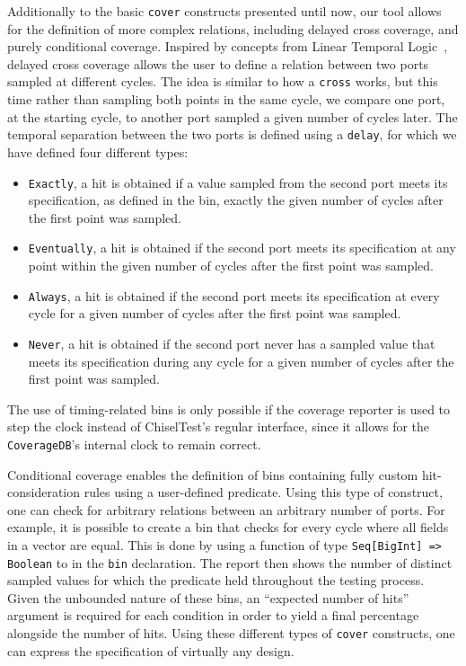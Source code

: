 \documentclass[conference]{IEEEtran}
\begin{document}
Additionally to the basic \texttt{cover} constructs presented until now, our tool allows for the definition of more complex relations, including delayed cross coverage, and purely conditional coverage.
Inspired by concepts from Linear Temporal Logic~\cite{Dax2010:temporal-logics}, delayed cross coverage allows the user to define a relation between two ports sampled at different cycles.
The idea is similar to how a \texttt{cross} works, but this time rather than sampling both points in the same cycle, we compare one port, at the starting cycle, to another port sampled a given number of cycles later. 
The temporal separation between the two ports is defined using a \texttt{delay}, for which we have defined four different types:
 \begin{itemize}
 \item \texttt{Exactly}, a hit is obtained if a value sampled from the second port meets its specification, as defined in the bin, exactly the given number of cycles after the first point was sampled.
 \item \texttt{Eventually}, a hit is obtained if the second port meets its specification at any point within the given number of cycles after the first point was sampled.  
 \item \texttt{Always}, a hit is obtained if the second port meets its specification at every cycle for a given number of cycles after the first point was sampled.
 \item \texttt{Never}, a hit is obtained if the second port never has a sampled value that meets its specification during any cycle for a given number of cycles after the first point was sampled.
\end{itemize} 
The use of timing-related bins is only possible if the coverage reporter is used to step the clock instead of ChiselTest's regular interface, since it allows for the \texttt{CoverageDB}'s internal clock to remain correct.

Conditional coverage enables the definition of bins containing fully custom hit-consideration rules using a user-defined predicate.
Using this type of construct, one can check for arbitrary relations between an arbitrary number of ports.
For example, it is possible to create a bin that checks for every cycle where all fields in a vector are equal.
This is done by using a function of type \texttt{Seq[BigInt] => Boolean} to in the \texttt{bin} declaration.
The report then shows the number of distinct sampled values for which the predicate held throughout the testing process.
Given the unbounded nature of these bins, an ``expected number of hits'' argument is required for each condition in order to yield a final percentage alongside the number of hits.
Using these different types of \texttt{cover} constructs, one can express the specification of virtually any design.
\end{document}
